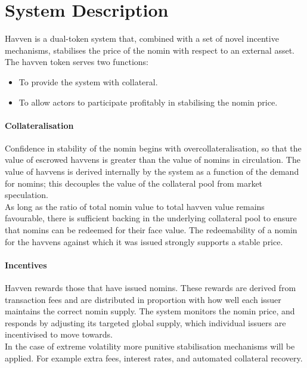 \section{System Description} Havven is a dual-token system that, combined with a set of novel incentive mechanisms, stabilises the price of the nomin with respect to an external asset. \\

\noindent The havven token serves two functions:

\begin{itemize}
\item{To provide the system with collateral.}
\item{To allow actors to participate profitably in stabilising the nomin price.}
\end{itemize}

\paragraph{Collateralisation}

\noindent Confidence in stability of the nomin begins with overcollateralisation, so that the value of escrowed havvens is greater than the value of nomins in circulation. The value of havvens is derived internally by the system as a function of the demand for nomins; this decouples the value of the collateral pool from market speculation. \\

\noindent As long as the ratio of total nomin value to total havven value remains favourable, there is sufficient backing in the underlying collateral pool to ensure that nomins can be redeemed for their face value. The redeemability of a nomin for the havvens against which it was issued strongly supports a stable price.  

\paragraph{Incentives}

\noindent Havven rewards those that have issued nomins. These rewards are derived from transaction fees and are distributed in proportion with how well each issuer maintains the correct nomin supply. The system monitors the nomin price, and responds by adjusting its targeted global supply, which individual issuers are incentivised to move towards.  \\

\noindent In the case of extreme volatility more punitive stabilisation mechanisms will be applied. For example extra fees, interest rates, and automated collateral recovery.

